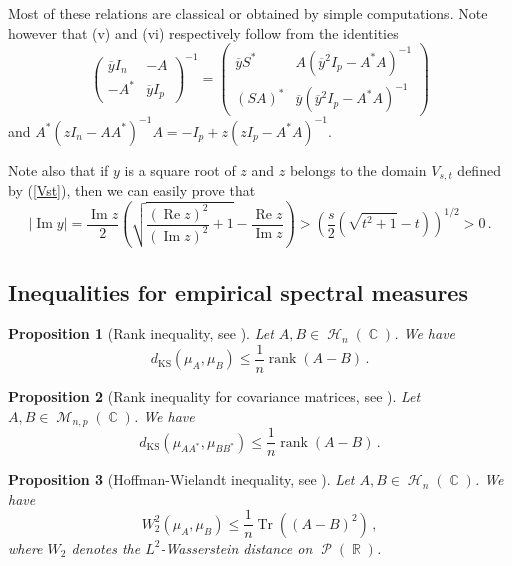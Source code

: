 \documentclass[11pt,a4paper]{article}
\DeclareMathOperator{\R}{\mathbb{R}}
\DeclareMathOperator{\C}{\mathbb{C}}
\DeclareMathOperator{\HH}{\mathcal{H}}
\DeclareMathOperator{\MM}{\mathcal{M}}
\DeclareMathOperator{\PP}{\mathcal{P}}
\DeclareMathOperator{\1}{\mathbf{1}}
\DeclareMathOperator{\Reel}{\mathrm{Re}}
\DeclareMathOperator{\Imag}{\mathrm{Im}}
\DeclareMathOperator{\Tr}{\mathrm{Tr}}
\DeclareMathOperator{\rg}{\mathrm{rank}}
\newcommand{\dKS}{d_{\mathrm{KS}}}
\newtheorem{Proposition}{Proposition}[section]
\theoremstyle{definition}
\begin{document}
Most of these relations are classical or obtained by simple computations. Note however that (v) and (vi) respectively follow from the identities
\begin{displaymath}
\left( \begin{array}{c|c} \overline{y}I_n & -A \\ \hline -A^* & \overline{y}I_p \end{array} \right)^{-1} = \left( \begin{array}{c|c} \overline{y} S^* & A(\overline{y}^2 I_p-A^*A)^{-1} \\ \hline (SA)^* & \overline{y} (\overline{y}^2 I_p-A^*A)^{-1} \end{array} \right)
\end{displaymath}
and $A^*(zI_n-AA^*)^{-1}A = -I_p + z(zI_p-A^*A)^{-1}$.

Note also that if $y$ is a square root of $z$ and $z$ belongs to the domain $V_{s,t}$ defined by (\ref{Vst}), then we can easily prove that
\begin{equation} \label{Imy}
|\Imag y| = \frac{\Imag z}{2} \left( \sqrt{\frac{(\Reel z)^2}{(\Imag z)^2} + 1} - \frac{\Reel z}{\Imag z} \right) > \left( \frac{s}{2} (\sqrt{t^2+1}-t) \right)^{1/2} > 0 \, .
\end{equation}




\subsection{Inequalities for empirical spectral measures} \label{inequalities_ESM}

\begin{Proposition}[Rank inequality, see {\cite[Lemma B.1]{BC}}]
Let $A,B \in \HH_n(\C)$. We have
\begin{equation} \label{rank_inequality}
\dKS(\mu_A,\mu_B) \le \frac1n \rg(A-B) \, .
\end{equation}
\end{Proposition}

\begin{Proposition}[Rank inequality for covariance matrices, see {\cite[Theorem A.44]{BS}}]
Let $A,B \in \MM_{n,p}(\C)$. We have
\begin{equation} \label{rank_covariance}
\dKS(\mu_{AA^*},\mu_{BB^*}) \le \frac1n \rg(A-B) \, .
\end{equation}
\end{Proposition}

\begin{Proposition}[Hoffman-Wielandt inequality, see {\cite[Lemma B.2]{BC}}]
Let $A,B \in \HH_n(\C)$. We have
\begin{equation} \label{HW_inequality}
W_2^2(\mu_A,\mu_B) \le \frac1n \Tr((A-B)^2) \, ,
\end{equation}
where $W_2$ denotes the $L^2$-Wasserstein distance on $\PP(\R)$.
\end{Proposition}
\end{document}
